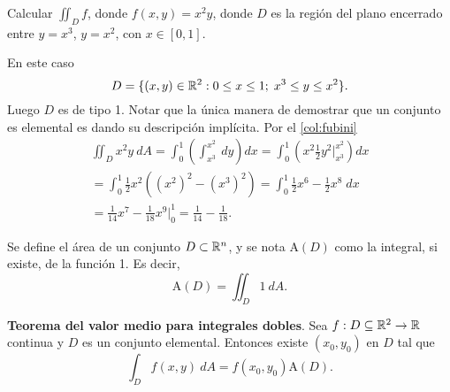\begin{example}
    Calcular $\iint_D f$, donde $f(x,y)=x^2y$, donde $D$ es la regi\'on del plano encerrado entre $y=x^3$, $y=x^2$, con $x\in[0,1]$. 

    \begin{center}
    \end{center}

    En este caso 
    \[
        D=\{(x,y)\in\mathbb{R}^2:0\leq x\leq1;\;x^3\leq y\leq x^2\}.  
    \]
    Luego $D$ es de tipo 1. Notar que la \'unica manera de demostrar que un conjunto es elemental es dando su descripci\'on impl\'icita. Por el \autoref{col:fubini}
    \begin{gather*}
        \iint_D x^2y\:dA=\int_0^1\left(\int_{x^3}^{x^2}\:dy\right)dx=\int_0^1\left(x^2\frac{1}{2}y^2\Big\lvert_{x^3}^{x^2}\right)dx\\
        =\int_0^1\frac{1}{2}x^2\left((x^2)^2-(x^3)^2\right)=\int_0^1\frac{1}{2}x^6-\frac{1}{2}x^8\;dx\\=\frac{1}{14}x^7-\frac{1}{18}x^9\Big\lvert_0^1=\frac{1}{14}-\frac{1}{18}.
    \end{gather*}
\end{example}
\begin{definition} %
    Se define el \'area de un conjunto $D\subset\mathbb{R}^n$, y se nota $\text{A}(D)$ como la integral, si existe, de la funci\'on 1. Es decir,
    \[
        \text{A}(D)=\iint_D1\:dA.
    \]
\end{definition}
\begin{theorem}
    \textbf{Teorema del valor medio para integrales dobles}. Sea $f:D\subseteq\mathbb{R}^2\to\mathbb{R}$ continua y $D$ es un conjunto elemental. Entonces existe $(x_0,y_0)$ en $D$ tal que
    \[
        \int_D f(x,y)\:dA=f(x_0,y_0)\text{A}(D).
    \]
\end{theorem}

